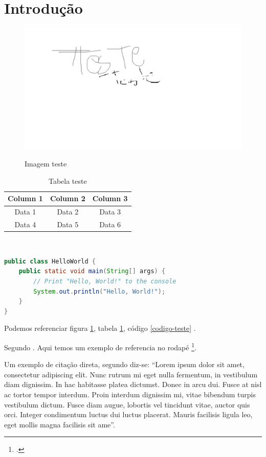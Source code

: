\section{Introdução}
\begin{figure}[H]
    \centering
    \caption{Imagem teste}
    \includegraphics[width=0.5\linewidth]{images/Teste.png}\\
    \label{fig:figura-teste}
\end{figure}

\begin{table}[H]
    \centering
    \caption{Tabela teste}
    \begin{tabular}{|c|c|c|}
        \hline
        Column 1 & Column 2 & Column 3 \\
        \hline
        Data 1 & Data 2 & Data 3 \\
        \hline
        Data 4 & Data 5 & Data 6 \\
        \hline
    \end{tabular}\\
    \label{tabular:teste1}
\end{table}

\begin{lstlisting}[caption={Código teste},language=Java,label=codigo-teste]
public class HelloWorld {
    public static void main(String[] args) {
        // Print "Hello, World!" to the console
        System.out.println("Hello, World!");
    }
}
\end{lstlisting}

\newpage

Podemos referenciar figura \ref{fig:figura-teste}, tabela \ref{tabular:teste1}, código \ref{codigo-teste} \cite{doe2021example}.

Segundo \textcite{smith2020example}. Aqui temos um exemplo de referencia no rodapé \footcite{smith2020example}.

Um exemplo de citação direta, segundo \textcite[p.~30]{miller2019example} diz-se: ``Lorem ipsum dolor sit amet, consectetur adipiscing elit. Nunc rutrum mi eget nulla fermentum, in vestibulum diam dignissim. In hac habitasse platea dictumst. Donec in arcu dui. Fusce at nisl ac tortor tempor interdum. Proin interdum dignissim mi, vitae bibendum turpis vestibulum dictum. Fusce diam augue, lobortis vel tincidunt vitae, auctor quis orci. Integer condimentum luctus dui luctus placerat. Mauris facilisis ligula leo, eget mollis magna facilisis sit ame''.